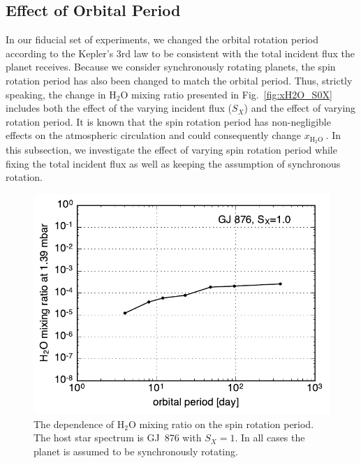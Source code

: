 \documentclass[11pt,numberedappendix,twocolappendix,]{emulateapj}
\def\water{H$_2$O }
\def\xwater{\dsa{$x_\text{\water}$}}
\newcommand{\dsa}[1]{{\color{blue}#1}}
\begin{document}
\subsection{Effect of Orbital Period}
\label{ss:sensitivity_Porbit}

In our fiducial set of experiments, we changed the orbital rotation period according to the Kepler's 3rd law to be consistent with the total incident flux the planet receives. 
Because we consider synchronously rotating planets, the spin rotation period has also been changed to match the orbital period. 
Thus, strictly speaking, the change in \water mixing ratio presented in Fig.~\ref{fig:xH2O_S0X} includes both the effect of the varying incident flux ($S_X$) and the effect of varying rotation period. 
It is known that the spin rotation period has non-negligible effects on the atmospheric circulation \citep{Yang2013, Kopparapu2016, Way2016} and could consequently change \xwater. 
In this subsection, we investigate the effect of varying spin rotation period while fixing the total incident flux as well as keeping the assumption of synchronous rotation. 


\begin{figure}[!h]
    \begin{center}
    \includegraphics[width=\hsize]{fig/xH2O_Prot.pdf}
    \end{center}
\caption{The dependence of \water mixing ratio on the spin rotation period. The host star spectrum is GJ~876 with $S_X=1$. In all cases the planet is assumed to be synchronously rotating. }
\label{fig:changeP}
\end{figure}
\end{document}
